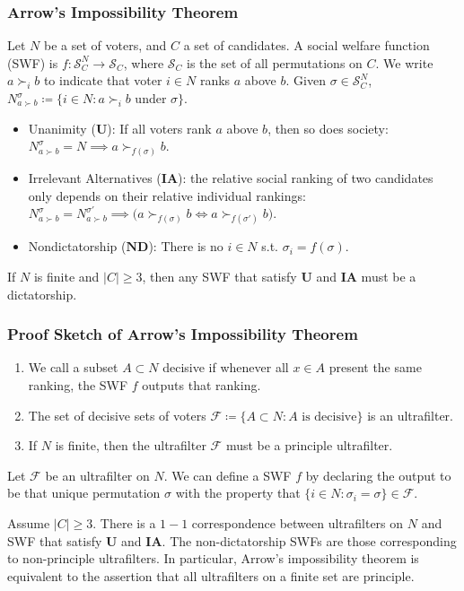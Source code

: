 \documentclass[UTF8,aspectratio=43,11pt,colorlinks,compress,openany]{beamer}%
\begin{document}
\begin{frame}\frametitle{Arrow's Impossibility Theorem}
Let $N$ be a set of voters, and $C$ a set of candidates. A social welfare function (SWF) is $f: \mathcal{S}_C^N\to \mathcal{S}_C$, where $\mathcal{S}_C$ is the set of all permutations on $C$. We write $a\succ_i b$ to indicate that voter $i\in N$ ranks $a$ above $b$. Given $\sigma\in \mathcal{S}_C^N$, $N_{a\succ b}^{\sigma}\coloneqq \{i\in N: a\succ_i b \mbox{ under } \sigma\}$.
\begin{itemize}
	\item Unanimity ($\mathbf{U}$): If all voters rank $a$ above $b$, then so does society: $N_{a\succ b}^{\sigma}=N\implies a\succ_{f(\sigma)}b$.
	\item Irrelevant Alternatives ($\mathbf{IA}$): the relative social ranking of two candidates only depends on their relative individual rankings: $N_{a\succ b}^{\sigma}=N_{a\succ b}^{\sigma'}\implies \Big(a\succ_{f(\sigma)}b\iff a\succ_{f(\sigma')}b\Big)$.
	\item Nondictatorship ($\mathbf{ND}$): There is no $i\in N$ s.t. $\sigma_i=f(\sigma)$.
\end{itemize}
\begin{theorem}
If $N$ is finite and $|C|\geq 3$, then any SWF that satisfy $\mathbf{U}$ and $\mathbf{IA}$ must be a dictatorship.
\end{theorem}
\end{frame}

\begin{frame}\frametitle{Proof Sketch of Arrow's Impossibility Theorem}
\begin{enumerate}
	\item We call a subset $A\subset N$ decisive if whenever all $x\in A$ present the same ranking, the SWF $f$ outputs that ranking.
	\item The set of decisive sets of voters $\mathcal{F}\coloneqq \{A\subset N: A \mbox{ is decisive}\}$ is an ultrafilter.
	\item If $N$ is finite, then the ultrafilter $\mathcal{F}$ must be a principle ultrafilter.
\end{enumerate}
Let $\mathcal{F}$ be an ultrafilter on $N$. We can define a SWF $f$ by declaring the output to be that unique permutation $\sigma$ with the property that $\{i\in N: \sigma_i=\sigma\}\in \mathcal{F}$.
\begin{theorem}
Assume $|C|\geq 3$. There is a $1-1$ correspondence between ultrafilters on $N$ and SWF that satisfy $\mathbf{U}$ and $\mathbf{IA}$. The non-dictatorship SWFs are those corresponding to non-principle ultrafilters. In particular, Arrow's impossibility theorem is equivalent to the assertion that all ultrafilters on a finite set are principle.
\end{theorem}
\end{frame}
\end{document}
